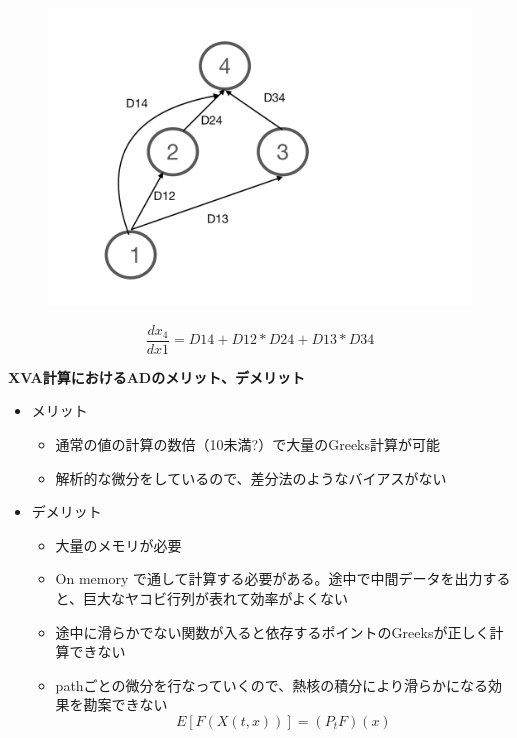 \documentclass[driverfallback=dvipdfmx,cjk]{beamer}
\begin{document}
\begin{frame}
    \begin{figure}
    \includegraphics[scale=0.4]{AADImage.pdf}
    \end{figure}
    $$ \frac{d x_4}{d x1} = D14 + D12 * D24 + D13 * D34$$
\end{frame}

\begin{frame}\textbf{XVA計算におけるADのメリット、デメリット}\\
    \begin{itemize}
    \item メリット
    \begin{itemize}
        \item 通常の値の計算の数倍（10未満?）で大量のGreeks計算が可能
        \item 解析的な微分をしているので、差分法のようなバイアスがない
    \end{itemize}
    \item デメリット
    \begin{itemize}
        \item 大量のメモリが必要
        \item On memory で通して計算する必要がある。途中で中間データを出力すると、巨大なヤコビ行列が表れて効率がよくない
        \item 途中に滑らかでない関数が入ると依存するポイントのGreeksが正しく計算できない
        \item pathごとの微分を行なっていくので、熱核の積分により滑らかになる効果を勘案できない
        $$ E[F(X(t, x))] = (P_t F)(x)$$
    \end{itemize}
    \end{itemize}

\end{frame}
\end{document}

